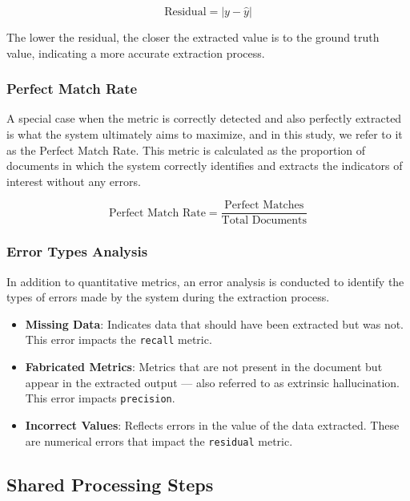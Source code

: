\documentclass[english, 12pt, a4paper, elec, utf8, a-2b, online]{aaltothesis}
\begin{document}
\begin{equation}
    \text{Residual} = |y - \hat{y}|
\end{equation}

The lower the residual, the closer the extracted value is to the ground truth value, indicating a more accurate extraction process.

\subsubsection{Perfect Match Rate}

A special case when the metric is correctly detected and also perfectly extracted is what the system ultimately aims to maximize, and in this study, we refer to it as the Perfect Match Rate.
This metric is calculated as the proportion of documents in which the system correctly identifies and extracts the indicators of interest without any errors.

\begin{equation}
    \text{Perfect Match Rate} = \frac{\text{Perfect Matches}}{\text{Total Documents}}
\end{equation}

\subsubsection{Error Types Analysis}

In addition to quantitative metrics, an error analysis is conducted to identify the types of errors made by the system during the extraction process.

\begin{itemize}
    \item \textbf{Missing Data}: Indicates data that should have been extracted but was not.
    This error impacts the \texttt{recall} metric.
    \item \textbf{Fabricated Metrics}: Metrics that are not present in the document but appear in the extracted output --- also referred to as extrinsic hallucination.
    This error impacts \texttt{precision}.
    \item \textbf{Incorrect Values}: Reflects errors in the value of the data extracted.
    These are numerical errors that impact the \texttt{residual} metric.
\end{itemize}

\subsection{Shared Processing Steps}
\end{document}
